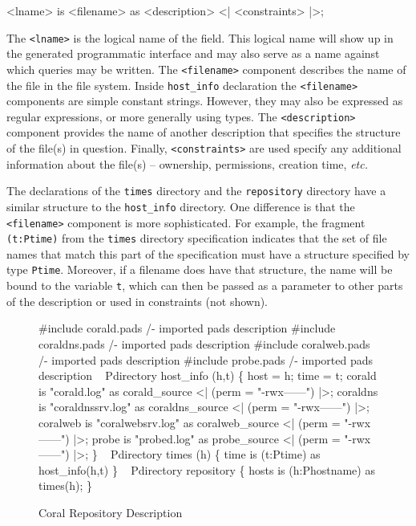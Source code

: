 \begin{code}
<lname> is <filename> as <description> <| <constraints> |>;
\end{code}

The {\tt <lname>} is the logical name of the field.  This logical name
will show up in the generated programmatic interface and may also
serve as a name against which queries may be written.  The 
 {\tt <filename>} component describes the name of the file in the file
system.  Inside {\tt  host\_info} declaration the {\tt <filename>} components
are simple constant strings.  However, they may also be expressed as regular expressions,
or more generally using \pads{} types.  The {\tt <description>} component
provides the name of another description that specifies the structure of the file(s) in question.
Finally, {\tt <constraints>} are used specify any additional information about the
file(s) -- ownership, permissions, creation time, {\em etc.}

The declarations of the {\tt times} directory and the {\tt repository} directory
have a similar structure to the {\tt host\_info} directory.  One difference is that
the {\tt <filename>} component is more sophisticated.  For example, the fragment
{\tt (t:Ptime)} from the {\tt times} directory specification indicates that the
set of file names that match this part of the specification must have a structure
specified by \pads{} type {\tt Ptime}.  Moreover, if a filename does have that structure,
the name will be bound to the variable {\tt t}, which can then be passed as a parameter
to other parts of the description or used in constraints (not shown).

\begin{figure}
\begin{code}
\#include corald.pads     /- imported pads description 
\#include coraldns.pads   /- imported pads description 
\#include coralweb.pads   /- imported pads description 
\#include probe.pads      /- imported pads description 
{\ }
Pdirectory host\_info (h,t) \{
  host = h;
  time = t;
  corald   is  "corald.log"       as corald\_source   <| (perm = "-rwx------") |>;
  coraldns is  "coraldnssrv.log"  as coraldns\_source <| (perm = "-rwx------") |>;
  coralweb is  "coralwebsrv.log"  as coralweb\_source <| (perm = "-rwx------") |>; 
  probe    is  "probed.log"       as probe\_source    <| (perm = "-rwx------") |>;
 \}
{\ }
Pdirectory times (h) \{
  time     is (t:Ptime)           as host_info(h,t)
\}
{\ }
Pdirectory repository \{
   hosts   is (h:Phostname)       as times(h);
\}
\end{code}
\caption{Coral Repository Description}
\label{figure:coral-repo}
\end{figure}